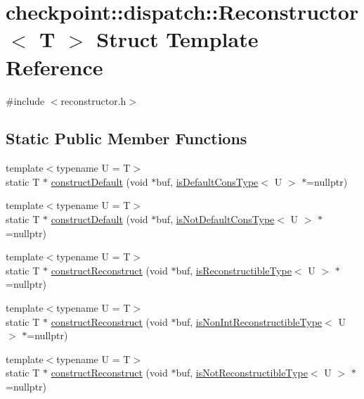 \hypertarget{structcheckpoint_1_1dispatch_1_1_reconstructor}{}\section{checkpoint\+:\+:dispatch\+:\+:Reconstructor$<$ T $>$ Struct Template Reference}
\label{structcheckpoint_1_1dispatch_1_1_reconstructor}


{\ttfamily \#include $<$reconstructor.\+h$>$}

\subsection*{Static Public Member Functions}
\begin{DoxyCompactItemize}
\item 
{\footnotesize template$<$typename U  = T$>$ }\\static T $\ast$ \hyperlink{structcheckpoint_1_1dispatch_1_1_reconstructor_af09a6d0312dbed7c8a311350b689794d}{construct\+Default} (void $\ast$buf, \hyperlink{namespacecheckpoint_a58224a3b056d9e2aa73d563871981a7d}{is\+Default\+Cons\+Type}$<$ U $>$ $\ast$=nullptr)
\item 
{\footnotesize template$<$typename U  = T$>$ }\\static T $\ast$ \hyperlink{structcheckpoint_1_1dispatch_1_1_reconstructor_a74ded346aaee98f25dc498322e6e1411}{construct\+Default} (void $\ast$buf, \hyperlink{namespacecheckpoint_a4032c86e7c92702198dd675a2696ee2c}{is\+Not\+Default\+Cons\+Type}$<$ U $>$ $\ast$=nullptr)
\item 
{\footnotesize template$<$typename U  = T$>$ }\\static T $\ast$ \hyperlink{structcheckpoint_1_1dispatch_1_1_reconstructor_a86a95e9ca24e30a627ed6626f19db4a2}{construct\+Reconstruct} (void $\ast$buf, \hyperlink{namespacecheckpoint_a126da7cae6bbbec231bb2552dc3ad6cc}{is\+Reconstructible\+Type}$<$ U $>$ $\ast$=nullptr)
\item 
{\footnotesize template$<$typename U  = T$>$ }\\static T $\ast$ \hyperlink{structcheckpoint_1_1dispatch_1_1_reconstructor_ad1362a1e66b441a04e4bb4b7245eb3c4}{construct\+Reconstruct} (void $\ast$buf, \hyperlink{namespacecheckpoint_a46b7909fb0fef92b4787567fde7c760b}{is\+Non\+Int\+Reconstructible\+Type}$<$ U $>$ $\ast$=nullptr)
\item 
{\footnotesize template$<$typename U  = T$>$ }\\static T $\ast$ \hyperlink{structcheckpoint_1_1dispatch_1_1_reconstructor_a8a504054312ef8e5703d938cc2ef75be}{construct\+Reconstruct} (void $\ast$buf, \hyperlink{namespacecheckpoint_a0054cbef71b90d6860e1d3916cf9d299}{is\+Not\+Reconstructible\+Type}$<$ U $>$ $\ast$=nullptr)

\end{DoxyCompactItemize}
